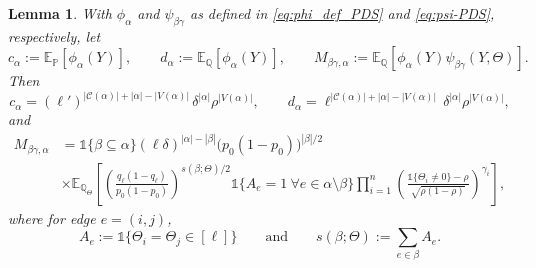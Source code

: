 \documentclass[10pt,a4paper]{amsart}
\newtheorem{lemma}{Lemma}
\newcommand{\E}{\mathbb{E}}
\newcommand{\PP}{\mathbb{P}}
\newcommand{\QQ}{\mathbb{Q}}
\begin{document}
\begin{lemma}\label{lem:PDS-cMd}
With \(\phi_\alpha\) and \(\psi_{\beta\gamma}\) as defined in \eqref{eq:phi_def_PDS} and \eqref{eq:psi-PDS}, respectively, let
\[
c_\alpha:=\E_{\PP}[\phi_\alpha(Y)],
\qquad
d_\alpha:=\E_{\QQ}[\phi_\alpha(Y)],
\qquad
M_{\beta\gamma,\alpha}:=\E_{\QQ} \left[\phi_\alpha(Y)\psi_{\beta\gamma}(Y,\Theta)\right].
\]
Then
\[
c_\alpha
=
(\ell')^{|\mathcal{C}(\alpha)|+|\alpha|-|V(\alpha)|}\,
\delta^{|\alpha|}\rho^{|V(\alpha)|}, \qquad 
d_\alpha
=
\ell^{|\mathcal{C}(\alpha)|+|\alpha|-|V(\alpha)|}\,
\delta^{|\alpha|}\rho^{|V(\alpha)|},
\]
and
\begin{align*}
M_{\beta\gamma,\alpha}
&=
\mathds 1\{\beta\subseteq\alpha\}
(\ell\delta)^{|\alpha|-|\beta|}
\bigl(p_0(1-p_0)\bigr)^{|\beta|/2}\\
& \times \E_{\QQ_\Theta} \left[
\left(\frac{q_\ell(1-q_\ell)}{p_0(1-p_0)}\right)^{s(\beta;\Theta)/2}
\mathds 1\{A_e=1 \ \forall e\in\alpha\setminus\beta\}
\prod_{i=1}^n
\left(\frac{\mathds 1\{\Theta_i\neq 0\}-\rho}{\sqrt{\rho(1-\rho)}}\right)^{\gamma_i}
\right],
\end{align*}
where for edge $e=(i,j)$,
\begin{equation}\label{eq:pds-ae-sbeta}
A_e:=\mathds 1\{\Theta_i=\Theta_j\in[\ell]\} 
\qquad \text{and} \qquad
s(\beta;\Theta):=\sum_{e\in\beta}A_e.
\end{equation}
\end{lemma}
\end{document}
